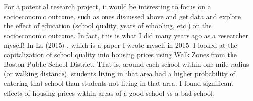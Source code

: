 \documentclass[12pt, final]{article}
\begin{document}
\\
\\
For a potential research project, it would be interesting to focus on a socioeconomic outcome, such as ones discussed above and get data and explore the effect of education (school quality, years of schooling, etc.) on the socioeconomic outcome. In fact, this is what I did many years ago as a researcher myself! In La (2015) \cite{La}, which is a paper I wrote myself in 2015, I looked at the capitalization of school quality into housing prices using Walk Zones from the Boston Public School District. That is, around each school within one mile radius (or walking distance), students living in that area had a higher probability of entering that school than students not living in that area. I found significant effects of housing prices within areas of a good school vs a bad school.
\end{document}
